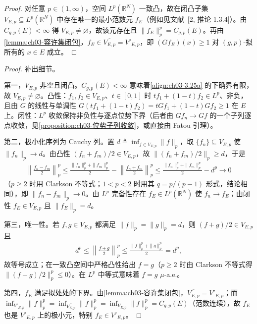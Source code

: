 \documentclass[../../main.tex]{subfiles}%
\begin{document}
\begin{proof}
对任意 $p\in(1,\infty)$，空间 $L^p(\mathbb{R}^N)$ 一致凸，故在闭凸子集 $V_{E,p}\subseteq L^p(\mathbb{R}^N)$ 中存在唯一的最小范数元 $f_E$（例如见文献~[2, 推论 1.3.4]）。由 $C_{g,p}(E)<\infty$ 得 $V_{E,p}\neq\varnothing$，故该元存在且 $\|f_E\|_p^p=C_{g,p}(E)$。再由\cref{lemma:ch03-容许集闭包}，$f_E\in\overline{V_{E,p}}=V'_{E,p}$，即 $(Gf_E)(x)\geqslant1$ 对 $(g,p)$-拟所有的 $x\in E$ 成立。
\end{proof}

\begin{proof}
补出细节。

第一，$V_{E,p}$ 非空且闭凸。$C_{g,p}(E)<\infty$ 意味着\eqref{align:ch03-3.25a} 的下确界有限，故 $V_{E,p}\neq\varnothing$。凸性：$f_1,f_2\in V_{E,p}$、$t\in[0,1]$ 时 $tf_1+(1-t)f_2\in L^p$、非负，且由 $G$ 的线性与单调性 $G(tf_1+(1-t)f_2)=tGf_1+(1-t)Gf_2\geqslant1$ 在 $E$ 上。闭性：$L^p$ 收敛保持非负性与逐点位势下界（后者由 $Gf_n\to Gf$ 的一个子列逐点收敛，见\cref{proposition:ch03-位势子列收敛}，或直接由 Fatou 引理）。

第二，极小化序列为 Cauchy 列。置 $d\triangleq\inf_{f\in V_{E,p}}\|f\|_p$，取 $\{f_n\}\subseteq V_{E,p}$ 使 $\|f_n\|_p\to d$。由凸性 $(f_n+f_m)/2\in V_{E,p}$，故 $\|(f_n+f_m)/2\|_p\geqslant d$，于是
\begin{align*}
\left\|\frac{f_n-f_m}{2}\right\|_p^p\leqslant\frac{\|f_n\|_p^p+\|f_m\|_p^p}{2}-\left\|\frac{f_n+f_m}{2}\right\|_p^p
\leqslant\frac{\|f_n\|_p^p+\|f_m\|_p^p}{2}-d^p\to0
\end{align*}
（$p\geqslant2$ 时用 Clarkson 不等式；$1<p<2$ 时用其 $q=p/(p-1)$ 形式，结论相同），即 $\|f_n-f_m\|_p\to0$。由 $L^p$ 完备性存在 $f_E\in L^p(\mathbb{R}^N)$ 使 $f_n\to f_E$；由闭性 $f_E\in V_{E,p}$ 且 $\|f_E\|_p=d$。

第三，唯一性。若 $f,g\in V_{E,p}$ 都满足 $\|f\|_p=\|g\|_p=d$，则 $(f+g)/2\in V_{E,p}$ 且
\begin{align*}
d^p\leqslant\left\|\frac{f+g}{2}\right\|_p^p\leqslant\frac{\|f\|_p^p+\|g\|_p^p}{2}=d^p,
\end{align*}
故等号成立；在一致凸空间中严格凸性给出 $f=g$（$p\geqslant2$ 时由 Clarkson 不等式得 $\|(f-g)/2\|_p^p\leqslant0$）。在 $L^p$ 中等式意味着 $f=g$ $\mu$-a.e.。

第四，$f_E$ 满足拟处处的下界。由\cref{lemma:ch03-容许集闭包}，$\overline{V_{E,p}}=V'_{E,p}$；而 $\inf_{V'_{E,p}}\|f\|_p^p=\inf_{\overline{V_{E,p}}}\|f\|_p^p=\inf_{V_{E,p}}\|f\|_p^p=C_{g,p}(E)$（范数连续），故 $f_E$ 也是 $V'_{E,p}$ 上的极小元，特别 $f_E\in V'_{E,p}$。
\end{proof}
\end{document}
